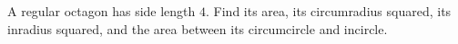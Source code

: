 A regular octagon has side length $4$. Find its area, its circumradius squared, its inradius squared, and the area between its circumcircle and incircle.

